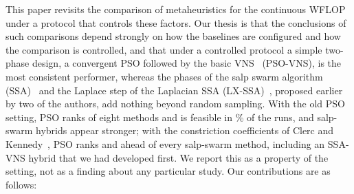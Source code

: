This paper revisits the comparison of metaheuristics for the continuous WFLOP under a protocol that controls these factors. Our thesis is that the conclusions of such comparisons depend strongly on how the baselines are configured and how the comparison is controlled, and that under a controlled protocol a simple two-phase design, a convergent PSO followed by the basic VNS~\cite{Mladenovic1997,Hansen2001} (PSO-VNS), is the most consistent performer, whereas the phases of the salp swarm algorithm (SSA)~\cite{Mirjalili2017} and the Laplace step of the Laplacian SSA (LX-SSA)~\cite{Solanki2023}, proposed earlier by two of the authors, add nothing beyond random sampling. With the old PSO setting, PSO ranks \NOldPSOPos{} of eight methods and is feasible in \NOldPSOFeas\% of the runs, and salp-swarm hybrids appear stronger; with the constriction coefficients of Clerc and Kennedy~\cite{Clerc2002}, PSO ranks \NPSOPos{} and ahead of every salp-swarm method, including an SSA-VNS hybrid that we had developed first.
We report this as a property of the setting, not as a finding about any particular study. Our contributions are as follows:
